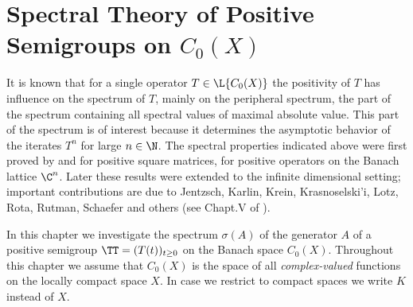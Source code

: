 

\chapter{Spectral Theory of Positive Semigroups on $C_{0}(X)$}\label{chap:b3}
It is known that for a single operator $T \in \L{C_{0}(X)}$ the positivity of $T$ has influence on the spectrum of $T$, mainly on the peripheral spectrum, \ie the part of the spectrum containing all spectral values of maximal absolute value.
This part of the spectrum is of interest because it determines the asymptotic behavior of the iterates $T^{n}$ for large $n \in \N$.
The spectral properties indicated above were first proved by \citet{perron:1907} and \citet{frobenius:1909} for positive square matrices, \ie for positive operators on the Banach lattice $\C^{n}$.
Later these results were extended to the infinite dimensional setting; important contributions are due to Jentzsch, Karlin, Krein, Krasnoselski'i, Lotz, Rota, Rutman, Schaefer and others (see Chapt.V of \citet{schaefer:1974}).

In this chapter we investigate the spectrum $\sigma(A)$ of the generator $A$ of a positive semigroup $\TT = (T(t))_{t \geq 0}$ on the Banach space $C_{0}(X)$.
Throughout this chapter we assume that $C_{0}(X)$ is the space of all \emph{complex-valued} functions on the locally compact space $X$.
In case we restrict to compact spaces we write $K$ instead of $X$.
